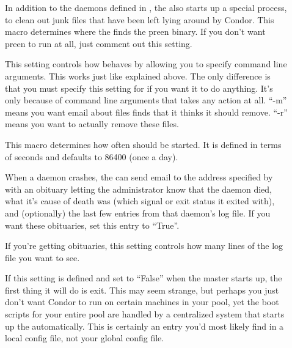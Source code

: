 \begin{description}
\item[] \label{param:Preen} In addition to the daemons
  defined in , the  also starts up
  a special process,  to clean out junk files that have
  been left lying around by Condor.  This macro determines where the
   finds the preen binary.
  If you don't want preen to run at all, just comment out this
  setting.

\item[] \label{param:PreenArgs} This setting
  controls how  behaves by allowing you to specify
  command line arguments.
  This works just like  explained above.
  The only difference is that you must specify this setting for
   if you want it to do anything.
  It's only because of command line arguments that 
  takes any action at all.
  ``-m'' means you want email about files  finds that it
  thinks it should remove.
  ``-r'' means you want  to actually remove these files.

\item[] \label{param:PreenInterval} This macro
  determines how often  should be started.  It is
  defined in terms of seconds and defaults to 86400 (once a day).

\item[] \label{param:PublishObituaries}
  When a daemon crashes, the  can send email to the
  address specified by  with an obituary letting
  the administrator know that the daemon died, what it's cause of
  death was (which signal or exit status it exited with), and
  (optionally) the last few entries from that daemon's log file.  If
  you want these obituaries, set this entry to ``True''.

\item[] \label{param:ObituaryLogLength}
  If you're getting obituaries, this setting controls how many lines
  of the log file you want to see.

\item[] \label{param:StartMaster} If this setting
  is defined and set to ``False'' when the master starts up, the first
  thing it will do is exit.  This may seem strange, but perhaps you
  just don't want Condor to run on certain machines in your pool, yet
  the boot scripts for your entire pool are handled by a centralized
  system that starts up the  automatically.  This is
  certainly an entry you'd most likely find in a local config file,
  not your global config file.


\end{description}

